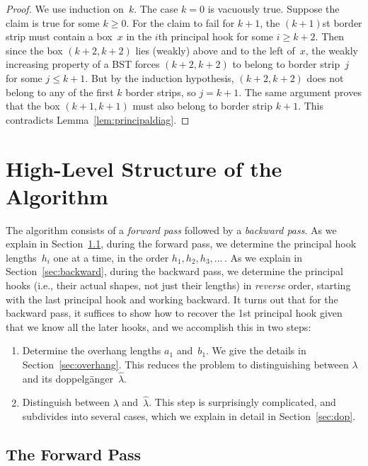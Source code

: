 \documentclass[12pt]{article}
\newcommand{\dop}{doppelg\"anger}
\theoremstyle{definition}
\begin{document}
\begin{proof}
We use induction on~$k$.  The case $k = 0$ is vacuously true.
Suppose the claim is true for some $k\ge 0$.
For the claim to fail for $k+1$,
the $(k+1)$st border strip must contain a box~$x$
in the $i$th principal hook for some $i \ge k+2$.
Then since the box $(k+2,k+2)$
lies (weakly) above and to the left of~$x$,
the weakly increasing property of a BST
forces $(k+2,k+2)$ to belong to border strip~$j$ for some $j\le k+1$.
But by the induction hypothesis, $(k+2,k+2)$
does not belong to any of the first $k$ border strips, so $j=k+1$.
The same argument proves that the box $(k+1,k+1)$
must also belong to border strip $k+1$.
This contradicts Lemma~\ref{lem:principaldiag}.
\end{proof}

\section{High-Level Structure of the Algorithm}
\label{sec:sketch}


The algorithm consists of a \emph{forward pass} followed by
a \emph{backward pass}.
As we explain in Section~\ref{sec:forward},
during the forward pass, we determine
the principal hook lengths~$h_i$ one at a time, in the order
$h_1, h_2, h_3, \ldots\,$.
As we explain in Section~\ref{sec:backward},
during the backward pass, we determine the principal hooks
(i.e., their actual shapes, not just their lengths) in \emph{reverse} order,
starting with the last principal hook and working backward.
It turns out that for the backward pass,
it suffices to show how to recover
the 1st principal hook given that we know all the later hooks,
and we accomplish this in two steps:
\begin{enumerate}
\item  Determine the overhang lengths $a_1$ and~$b_1$.
We give the details in Section~\ref{sec:overhang}.
This reduces the problem to distinguishing between $\lambda$
and its \dop~$\hat\lambda$.
\item  Distinguish between $\lambda$ and~$\hat\lambda$.
This step is surprisingly complicated, and subdivides into
several cases, which we explain in detail in Section~\ref{sec:dop}.
\end{enumerate}

\subsection{The Forward Pass}
\label{sec:forward}
\end{document}
